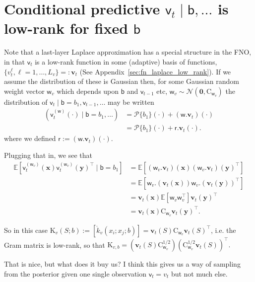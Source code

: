 \documentclass{article}
\newcommand{\vv}[1]{\boldsymbol{#1}}
\newcommand{\mm}[1]{\mathrm{#1}}
\newcommand{\rv}[1]{\mathsf{#1}}
\newcommand{\vrv}[1]{\vv{\rv{#1}}}
\newcommand{\dist}[1]{\mathcal{#1}}
\newcommand{\set}[1]{#1}
\newcommand{\op}[1]{\mathscr{#1}}
\newcommand{\gvn}{\mid}
\newcommand{\Ex}{\mathbb{E}}
\newcommand{\lat}{\rv{b}}   %
\newcommand{\latst}{b}      %
\begin{document}
\section{Conditional predictive \(\rv{v}_t\gvn\lat,\dots\) is low-rank for fixed \(\lat\)}

Note that a last-layer Laplace approximation has a special structure in the FNO, in that \(\rv{v}_{t}\) is a low-rank function in some (adaptive) basis of functions, \(\{v_{t}^\ell,\ell=1,\dots,L_v\}=:\vv{v}_{t}\) (See Appendix~\ref{sec:fn_laplace_low_rank}).
If we assume the distribution of these is Gaussian then, for some Gaussian random weight vector \(\vrv{w}_{v}\) which depends upon \(\lat\) and \(\rv{v}_{t-1}\) etc, \(\vrv{w}_{v} \sim \dist{N}\left(\vv{0}, \mm{C}_{\vrv{w}_{v}}\right)\) the  distribution of  \(\rv{v}_{t}\gvn \lat{=}\latst_{1},\rv{v}_{t-1},\dots\) may be written
\begin{align*}
  \left(\rv{v}_{t}^{(\vrv{w})}(\cdot) \gvn \lat{=}\latst_{1},\dots\right)
  &= \op{P}\{\latst_1\}(\cdot) +(\vrv{w}.\vv{v}_{t})(\cdot)\\
  &= \op{P}\{\latst_1\}(\cdot) +\rv{r}.\vv{v}_{t}(\cdot).
\end{align*}
where we defined \(\rv{r}:=(\vrv{w}.\vv{v}_{t})(\cdot).\)

Plugging that in, we see that 
\begin{align*}
  \Ex\left[ \rv{v}_{t}^{(\vrv{w}_{v})}(\vv{x})\rv{v}_{t}^{(\vrv{w}_{v})}(\vv{y})^{\top}\gvn \lat{=}\latst_{1}\right]
  &= \Ex \left[(\vrv{w}_{v}.\vv{v}_{t})(\vv{x})(\vrv{w}_{v}.\vv{v}_{t})(\vv{y})^{\top}\right]\\
  &= \Ex \left[\vrv{w}_{v}.(\vv{v}_{t}(\vv{x}))\vrv{w}_{v}.(\vv{v}_{t}(\vv{y}))^{\top}\right]\\
  &= \vv{v}_{t}(\vv{x})\Ex \left[\vrv{w}_{v}\vrv{w}_{v}^{\top}\right]\vv{v}_{t}(\vv{y})^{\top}\\
  &= \vv{v}_{t}(\vv{x})\mm{C}_{\vrv{w}_{v}}\vv{v}_{t}(\vv{y})^{\top}.
\end{align*}

So in this case \(\mm{K}_{v}(\set{S};\latst):=[\mathring{k}_{v}(x_{i};x_{j};\latst)]=\vv{v}_{t}(\set{S})\mm{C}_{\vrv{w}_{v}}\vv{v}_{t}(\set{S})^{\top}\), i.e. the Gram matrix is low-rank, so that 
\(\mm{K}_{v,\latst}=(\vv{v}_{t}(\set{S})\mm{C}_{\vrv{w}_{v}}^{1/2})(\mm{C}_{\vrv{w}_{v}}^{1/2}\vv{v}_{t}(\set{S}))^{\top}.\)

That is nice, but what does it buy us?
I think this gives us a way of sampling from the posterior given one single observation \(\rv{v}_{t}=v_t\) but not much else.
\end{document}

